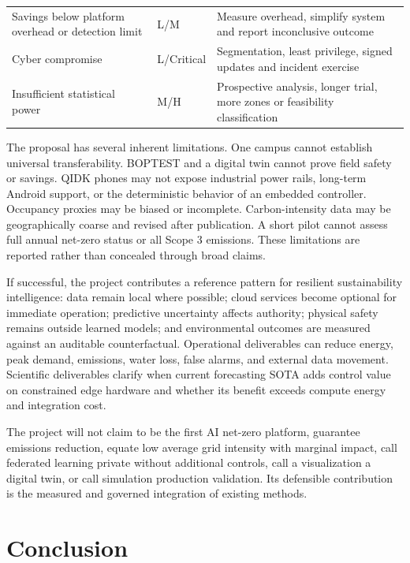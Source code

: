 \begin{table}[t]
\begin{tabularx}{\textwidth}{p{}p{}X}
		Savings below platform overhead or detection limit & L/M        & Measure overhead, simplify system and report inconclusive outcome            \\
		Cyber compromise                                   & L/Critical & Segmentation, least privilege, signed updates and incident exercise          \\
		Insufficient statistical power                     & M/H        & Prospective analysis, longer trial, more zones or feasibility classification \\
		\bottomrule
	\end{tabularx}
\end{table}

The proposal has several inherent limitations. One campus cannot establish universal transferability. BOPTEST and a digital twin cannot prove field safety or savings. QIDK phones may not expose industrial power rails, long-term Android support, or the deterministic behavior of an embedded controller. Occupancy proxies may be biased or incomplete. Carbon-intensity data may be geographically coarse and revised after publication. A short pilot cannot assess full annual net-zero status or all Scope 3 emissions. These limitations are reported rather than concealed through broad claims.

If successful, the project contributes a reference pattern for resilient sustainability intelligence: data remain local where possible; cloud services become optional for immediate operation; predictive uncertainty affects authority; physical safety remains outside learned models; and environmental outcomes are measured against an auditable counterfactual. Operational deliverables can reduce energy, peak demand, emissions, water loss, false alarms, and external data movement. Scientific deliverables clarify when current forecasting SOTA adds control value on constrained edge hardware and whether its benefit exceeds compute energy and integration cost.

The project will not claim to be the first AI net-zero platform, guarantee emissions reduction, equate low average grid intensity with marginal impact, call federated learning private without additional controls, call a visualization a digital twin, or call simulation production validation. Its defensible contribution is the measured and governed integration of existing methods.

\section{Conclusion}

